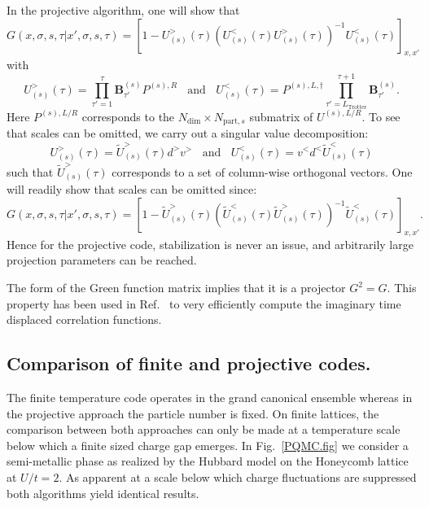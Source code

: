 In the projective algorithm, one will show  \cite{Assaad08_rev} that 
\begin{equation}\label{eqn:GreenT0_eq}
G(x,\sigma,s,\tau| x',\sigma,s,\tau)  =    \left[ 1 -  U^{>}_{(s)}(\tau)  \left(   U^{<}_{(s)}(\tau) U^{>}_{(s)}(\tau)  \right)^{-1}  U^{<}_{(s)}(\tau) \right]_{x,x'}
\end{equation}
with 
\begin{equation}
  U^{>}_{(s)}(\tau)  =    \prod_{\tau'=1}^{\tau} \bm{B}_{\tau'}^{(s)}   P^{(s),R}  \; \; 
\text{   and    }  \; \; 
  U^{<}_{(s)}(\tau)  =    P^{(s),L, \dagger} \prod_{\tau'=L_{\text{Trotter}} }^{\tau+1} \bm{B}_{\tau'}^{(s)}.   
\end{equation} 
Here  $P^{(s),L/R}$  corresponds to the $N_{\mathrm{dim}} \times N_{\mathrm{part},s} $  submatrix of $U^{(s),L/R}$.      To see that scales can be omitted, we carry out a singular value decomposition: 
\begin{equation}
	U^{>}_{(s)}(\tau)  =\tilde{U}^{>}_{(s)}(\tau)   d^{>} v^{>}   \; \; \text{   and    }  \; \;  U^{<}_{(s)}(\tau)  = v^{<}  d^{<} \tilde{U}^{<}_{(s)}(\tau)   
\end{equation}
such that $ \tilde{U}^{>}_{(s)}(\tau) $ corresponds to a set of column-wise orthogonal vectors.  One will readily show that  scales can be omitted since:
\begin{equation}
G(x,\sigma,s,\tau| x',\sigma,s,\tau)  =    \left[ 1 -  \tilde{U}^{>}_{(s)}(\tau)  \left(   \tilde{U}^{<}_{(s)}(\tau) \tilde{U}^{>}_{(s)}(\tau)  \right)^{-1}  \tilde{U}^{<}_{(s)}(\tau) \right]_{x,x'}.
\end{equation}
Hence for the projective code,  stabilization is never an issue, and arbitrarily large projection parameters  can be reached.  
 
The form of the Green function matrix implies that it is a projector $G^2 = G$.   This property has been used in Ref.~\cite{Feldbach00}  to very efficiently compute the imaginary time displaced correlation functions.  



\subsection{Comparison of finite and projective codes.}

The finite temperature code  operates in the grand canonical ensemble whereas  in the projective   approach  the particle number is fixed.   On finite lattices,   the comparison between both approaches can only  be made at a temperature scale   below which  a finite sized charge gap  emerges.  In Fig.~\ref{PQMC.fig}    we consider a semi-metallic phase  as realized by    the Hubbard model on the Honeycomb lattice  at $U/t=2$. As apparent   at a scale below which  charge fluctuations are  suppressed  both  algorithms yield identical results. 
        
